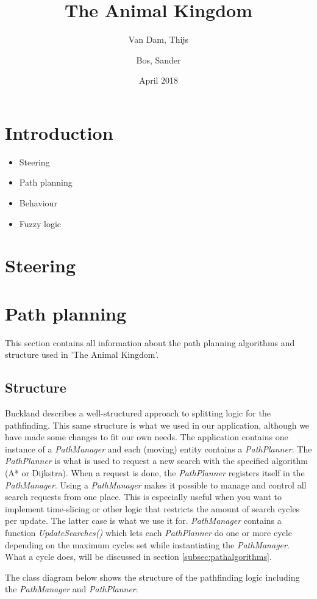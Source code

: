\documentclass[11pt]{article}
\author{Van Dam, Thijs\\
\and
Bos, Sander\\
}
\title{\huge The Animal Kingdom}
\date{April 2018}
\begin{document}
    \maketitle
    \thispagestyle{empty}
    \newpage
    \newpage
    \setcounter{page}{1}
    \section{Introduction}\label{sec:introduction}
    \begin{itemize}
        \item Steering
        \item Path planning
        \item Behaviour
        \item Fuzzy logic
    \end{itemize}

    \newpage
    \tableofcontents
    \newpage
    \section{Steering}\label{sec:steering}

    \newpage
    \section{Path planning}\label{sec:pathPlanning}
    This section contains all information about the path planning algorithms and structure used in 'The Animal Kingdom'.
    \subsection{Structure}\label{subsec:pathstructure}
    Buckland\cite{pgaie} describes a well-structured approach to splitting logic for the pathfinding.
    This same structure is what we used in our application, although we have made some changes to fit our own needs.
    The application contains one instance of a \textit{PathManager} and each (moving) entity contains a \textit{PathPlanner}.
    The \textit{PathPlanner} is what is used to request a new search with the specified algorithm (A* or Dijkstra).
    When a request is done, the \textit{PathPlanner} registers itself in the \textit{PathManager}.
    Using a \textit{PathManager} makes it possible to manage and control all search requests from one place.
    This is especially useful when you want to implement time-slicing or other logic that restricts the amount of search cycles per update.
    The latter case is what we use it for.
    \textit{PathManager} contains a function \textit{UpdateSearches()} which lets each \textit{PathPlanner} do one or more cycle depending on the maximum cycles set while instantiating the \textit{PathManager}.
    What a cycle does, will be discussed in section \ref{subsec:pathalgorithms}.\par
    The class diagram below shows the structure of the pathfinding logic including the \textit{PathManager} and \textit{PathPlanner}.
\end{document}
